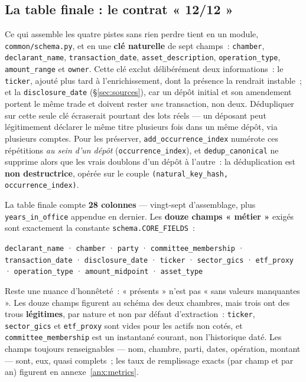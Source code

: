 \documentclass[11pt,a4paper]{article}
\newcommand{\co}[1]{\texttt{\small #1}}
\begin{document}
\subsection{La table finale : le contrat « 12/12 »}
\label{sec:table}
Ce qui assemble les quatre pistes sans rien perdre tient en un module, \co{common/schema.py}, et en une
\textbf{clé naturelle} de sept champs~: \co{chamber}, \co{declarant_name}, \co{transaction_date},
\co{asset_description}, \co{operation_type}, \co{amount_range} et \co{owner}. Cette clé exclut délibérément
deux informations~: le \co{ticker}, ajouté plus tard à l'enrichissement, dont la présence la rendrait
instable~; et la \co{disclosure_date} (§\ref{sec:sources}), car un dépôt initial et son amendement portent
le même trade et doivent rester \emph{une} transaction, non deux. Dédupliquer sur cette seule clé écraserait
pourtant des lots réels — un déposant peut légitimement déclarer le même titre plusieurs fois dans un même
dépôt, via plusieurs comptes. Pour les préserver, \co{add_occurrence_index} numérote ces répétitions
\emph{au sein d'un dépôt} (\co{occurrence_index}), et \co{dedup_canonical} ne supprime alors que les vrais
doublons d'un dépôt à l'autre~: la déduplication est \textbf{non destructrice}, opérée sur le couple
\co{(natural_key_hash, occurrence_index)}.

La table finale compte \textbf{28 colonnes} — vingt-sept d'assemblage, plus \co{years_in_office} appendue en
dernier. Les \textbf{douze champs « métier »} exigés sont exactement la constante \co{schema.CORE_FIELDS}~:
\begin{center}\small
\co{declarant_name} · \co{chamber} · \co{party} · \co{committee_membership} · \co{transaction_date} ·
\co{disclosure_date} · \co{ticker} · \co{sector_gics} · \co{etf_proxy} · \co{operation_type} ·
\co{amount_midpoint} · \co{asset_type}
\end{center}

Reste une nuance d'honnêteté~: « présents » n'est pas « sans valeurs manquantes ». Les douze champs figurent
au schéma des deux chambres, mais trois ont des trous \textbf{légitimes}, par nature et non par défaut
d'extraction~: \co{ticker}, \co{sector_gics} et \co{etf_proxy} sont vides pour les actifs non cotés, et
\co{committee_membership} est un instantané courant, non l'historique daté. Les champs toujours
renseignables — nom, chambre, parti, dates, opération, montant — sont, eux, quasi complets~; les taux de
remplissage exacts (par champ et par an) figurent en annexe~\ref{anx:metrics}.
\end{document}
